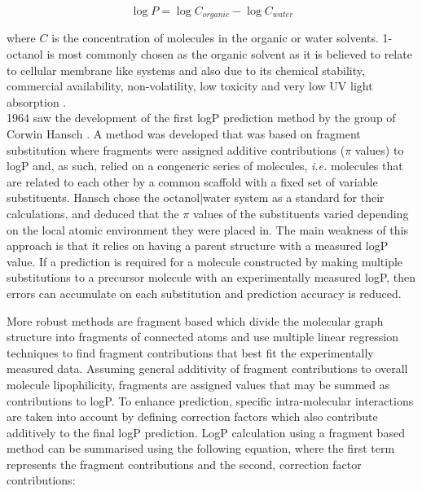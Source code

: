\documentclass[10pt]{bmc_article}
\newenvironment{bmcformat}{\begin{raggedright}\baselineskip20pt\sloppy\setboolean{publ}{false}}{\end{raggedright}\baselineskip20pt\sloppy}
\begin{document}
\begin{bmcformat}
\begin{equation}
  \label{eq:logP}
  \log{P} = \log{C_{organic}} - \log{C_{water}} 
\end{equation}

where $C$ is the concentration of molecules in the organic or water solvents. 1-octanol is most commonly chosen as the organic solvent as it is believed to relate to cellular membrane like systems and also due to its chemical stability, commercial availability, non-volatility, low toxicity and very low UV light absorption \cite{smith_selection_1975}.
\mbox{}\\

1964 saw the development of the first logP prediction method by the group of Corwin Hansch \cite{fujita_new_1964}. A method was developed that was based on fragment substitution where fragments were assigned additive contributions ($\pi$ values) to logP and, as such, relied on a congeneric series of molecules, \textit{i.e.} molecules that are related to each other by a common scaffold with a fixed set of variable substituents. Hansch chose the octanol|water system as a standard for their calculations, and deduced that the $\pi$ values of the substituents varied depending on the local atomic environment they were placed in. The main weakness of this approach is that it relies on having a parent structure with a measured logP value. If a prediction is required for a molecule constructed by making multiple substitutions to a precursor molecule with an experimentally measured logP, then errors can accumulate on each substitution and prediction accuracy is reduced.

More robust methods are fragment based \cite{rekker_calculation_1992, leo_partition_1971, hansch_substituent_1979, leo_calculating_1993, klopman_computer_1994, junghans_estimation_1997, japertas_fragmental_2002, meylan_estimating_2000, _molsoft_2013, petrauskas_acd/log_2000, _molinspiratoin_2013} which divide the molecular graph structure into fragments of connected atoms and use multiple linear regression techniques to find fragment contributions that best fit the experimentally measured data. Assuming general additivity of fragment contributions to overall molecule lipophilicity, fragments are assigned values that may be summed as contributions to logP. To enhance prediction, specific intra-molecular interactions are taken into account by defining correction factors which also contribute additively to the final logP prediction. LogP calculation using a fragment based method can be summarised using the following equation, where the first term represents the fragment contributions and the second, correction factor contributions:


\end{bmcformat}
\end{document}
